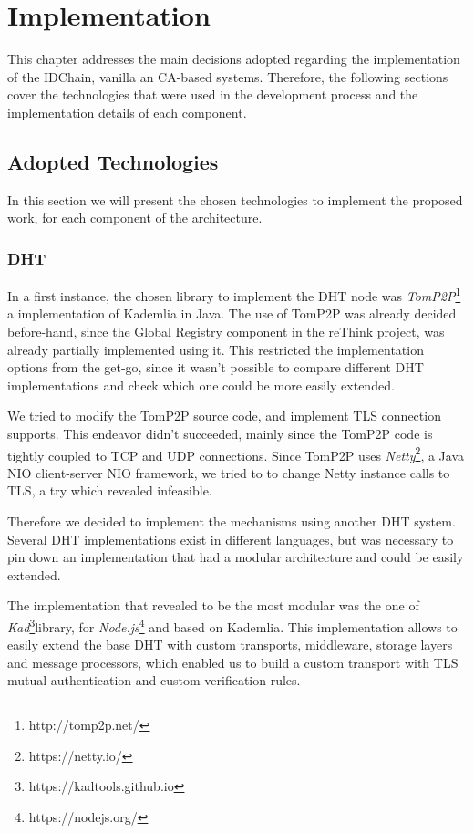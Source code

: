 \chapter{Implementation}
\label{chapter:implementation}

This chapter addresses the main decisions adopted regarding the implementation of the IDChain, vanilla an CA-based systems. Therefore, the following sections cover the technologies that were used in the development process and the implementation details of each component.

\section{Adopted Technologies}

In this section we will present the chosen technologies to implement the proposed work, for each component of the architecture.

\subsection{DHT}

In a first instance, the chosen library to implement the DHT node was \textit{TomP2P}\footnote{http://tomp2p.net/} a implementation of Kademlia in Java.
The use of TomP2P was already decided before-hand, since the Global Registry component in the reThink project, was already partially implemented using it.
This restricted the implementation options from the get-go, since it wasn't possible to compare different \ac{DHT} implementations and check which one could be more easily extended.

We tried to modify the TomP2P source code, and implement TLS connection supports.
This endeavor didn't succeeded, mainly since the TomP2P code is tightly coupled to TCP and UDP connections.
Since TomP2P uses \textit{Netty}\footnote{https://netty.io/}, a Java NIO client-server \ac{NIO} framework, we tried to to change Netty instance calls to TLS, a try which revealed infeasible.

Therefore we decided to implement the mechanisms using another DHT system.
Several DHT implementations exist in different languages, but was necessary to pin down an implementation that had a modular architecture and could be easily extended.

The implementation that revealed to be the most modular was the one of \textit{Kad}\footnote{https://kadtools.github.io}library, for \textit{Node.js}\footnote{https://nodejs.org/} and based on Kademlia.
This implementation allows to easily extend the base DHT with custom transports, middleware, storage layers and message processors, which enabled us to build a custom transport with TLS mutual-authentication and custom verification rules.

